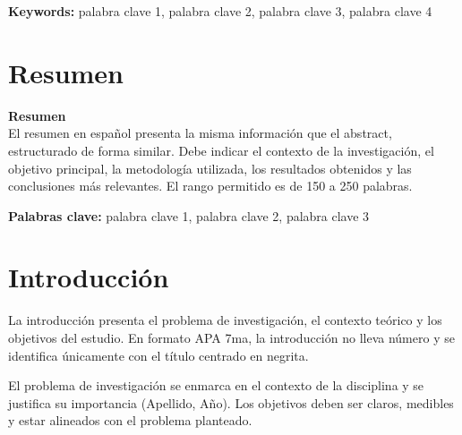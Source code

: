 \documentclass[12pt, a4paper, oneside]{article}
\begin{document}
\medskip
\textbf{Keywords:} palabra clave 1, palabra clave 2, palabra clave 3, palabra clave 4

\newpage
\section*{Resumen}
{\centering\textbf{Resumen}\\[0.2in]}
El resumen en español presenta la misma información que el abstract,
estructurado de forma similar. Debe indicar el contexto de la investigación,
el objetivo principal, la metodología utilizada, los resultados obtenidos y
las conclusiones más relevantes. El rango permitido es de 150 a 250 palabras.

\medskip
\textbf{Palabras clave:} palabra clave 1, palabra clave 2, palabra clave 3

\newpage
\tableofcontents

\newpage
\listoffigures
\newpage
\listoftables

\newpage
\selectfont
\doublespacing
\parindent=0.75in
\parskip=0in

\section*{Introducción}
La introducción presenta el problema de investigación, el contexto
teórico y los objetivos del estudio. En formato APA 7ma, la introducción
no lleva número y se identifica únicamente con el título centrado en negrita.

El problema de investigación se enmarca en el contexto de la disciplina
y se justifica su importancia (Apellido, Año). Los objetivos deben ser
claros, medibles y estar alineados con el problema planteado.
\end{document}

